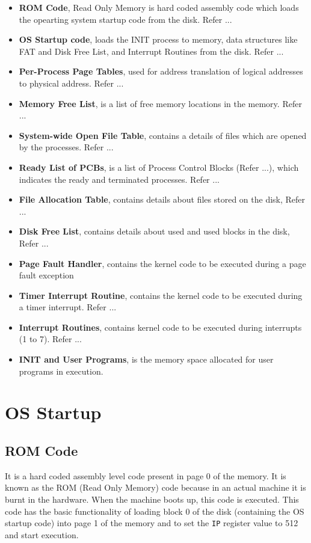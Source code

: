 \documentclass[11pt]{report}
\begin{document}
\begin{itemize}
	\item \textbf{ROM Code}, Read Only Memory is hard coded assembly code which loads the opearting system startup code from the disk. Refer  ... 
	\item \textbf{OS Startup code}, loads the INIT process to memory, data structures like FAT and Disk Free List, and Interrupt Routines from the disk. Refer ...
	\item \textbf{Per-Process Page Tables}, used for address translation of logical addresses to physical address. Refer ...
	\item \textbf{Memory Free List}, is a list of free memory locations in the memory. Refer ...
	\item \textbf{System-wide Open File Table}, contains a details of files which are opened by the processes. Refer ...
	\item \textbf{Ready List of PCBs}, is a list of Process Control Blocks (Refer ...), which indicates the ready and terminated processes. Refer ...
	\item \textbf{File Allocation Table}, contains details about files stored on the disk, Refer ...
	\item \textbf{Disk Free List}, contains details about used and used blocks in the disk, Refer ...
	\item \textbf{Page Fault Handler}, contains the kernel code to be executed during a page fault exception
	\item \textbf{Timer Interrupt Routine}, contains the kernel code to be executed during a timer interrupt. Refer ... 
	
	\item \textbf{Interrupt Routines}, contains kernel code to be executed during interrupts (1 to 7). Refer ...
	\item \textbf{INIT and User Programs}, is the memory space allocated for user programs in execution.
\end{itemize}

\chapter{OS Startup}
\label{chp:osstartup}



\section{ROM Code}
\label{lbl:romcode}
It is a hard coded assembly level code present in page 0 of the memory. It is known as the ROM (Read Only Memory) code because in an actual machine it is burnt in the hardware. When the machine boots up, this code is executed. This code has the basic functionality of loading block 0 of the disk (containing the OS startup code) into page 1 of the memory and to set the \texttt{IP} register value to 512 and start execution.
\end{document}
